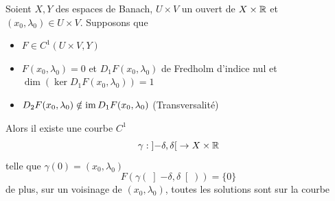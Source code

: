 \documentclass[memoire.tex]{subfiles}
\begin{document}
\begin{theobox}{}{}\label{fold}
    Soient $X,Y$ des espaces de Banach, $U\times V$ un ouvert de $X\times \mathbb{R}$ et $(x_0,\lambda_0)\in U\times V $.
    Supposons que
    \begin{itemize}
        \item $F\in C^1(U\times V,Y)$
        \item $F(x_0,\lambda_0)=0$ et $D_1F(x_0,\lambda_0)$ de Fredholm d'indice nul et $\dim (\ker D_1F(x_0,\lambda_0))=1$
        \item $D_2F(x_0,\lambda_0)\notin \operatorname{im} D_1F(x_0,\lambda_0)$ (Transversalité)
    \end{itemize}
    Alors il existe une courbe $C^1$
    \begin{equation*}
        \gamma:   \left] -\delta,\delta\right[ \rightarrow X\times\mathbb{R} 
    \end{equation*}
    telle que $\gamma(0)=(x_0,\lambda_0)$
    \begin{equation*}
        F(\gamma(\left] -\delta,\delta\right[))= \{0\}
    \end{equation*}
    de plus, sur un voisinage de $(x_0,\lambda_0)$, toutes les solutions sont sur la courbe
\end{theobox}
\end{document}
